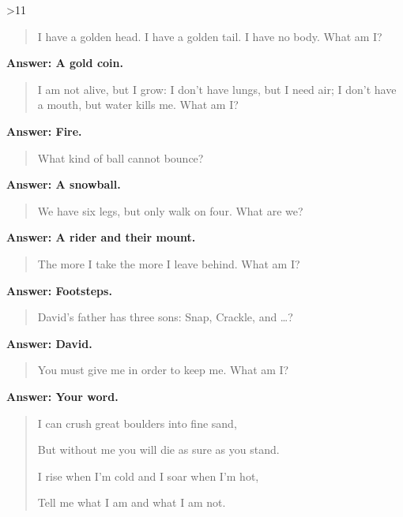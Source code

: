 \begin{multicols}{2}
\ifnum\month>11

\begin{quotation}
I have a golden head. I have a golden tail. I have no body.
What am I?
\end{quotation}

\textbf{Answer: A gold coin.}


\begin{quotation}
I am not alive, but I grow: I don't have lungs, but I need air; I don't have a mouth, but water kills me.
What am I?
\end{quotation}

\textbf{Answer: Fire.}

\begin{quotation}
What kind of ball cannot bounce?
\end{quotation}

\textbf{Answer: A snowball.}

\fi

\begin{quotation}

	We have six legs, but only walk on four.
	What are we?

\end{quotation}

\textbf{Answer: A rider and their mount.}


\begin{quotation}
	The more I take the more I leave behind.
	What am I?
\end{quotation}

\textbf{Answer: Footsteps.}

\begin{quotation}
	David's father has three sons: Snap, Crackle, and  \ldots?
\end{quotation}

\textbf{Answer: David.}

\begin{quotation}
You must give me in order to keep me.
What am I? 
\end{quotation}

\textbf{Answer: Your word.}

\begin{quotation}

I can crush great boulders into fine sand,

But without me you will die as sure as you stand.

I rise when I'm cold and I soar when I'm hot,

Tell me what I am and what I am not.


\end{quotation}
\end{multicols}
